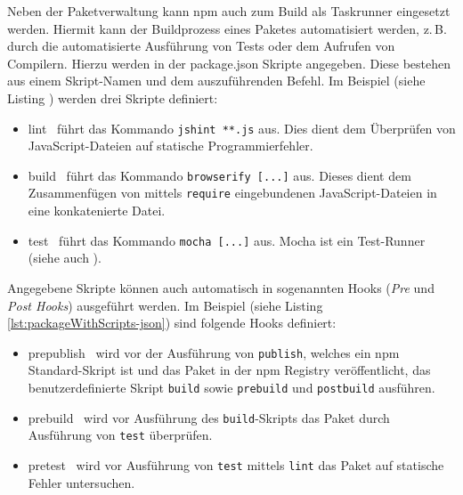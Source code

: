 \begin{figure}[H]
	
\end{figure}

Neben der Paketverwaltung kann npm auch zum Build als Taskrunner eingesetzt werden. Hiermit kann der Buildprozess eines Paketes automatisiert werden, z.\,B. durch die automatisierte Ausführung von Tests oder dem Aufrufen von Compilern. Hierzu werden in der package.json Skripte angegeben. Diese bestehen aus einem Skript-Namen und dem auszuführenden Befehl. Im Beispiel (siehe Listing \todo{}) werden drei Skripte definiert:\cite{cirkel-npmAsABuildTool}
\begin{itemize}
	\item \glqq lint\grqq~ führt das Kommando \texttt{jshint **.js} aus. Dies dient dem Überprüfen von JavaScript-Dateien auf statische Programmierfehler\cite{jshint-about}.
	\item \glqq build\grqq~ führt das Kommando \texttt{browserify [...]} aus. Dieses dient dem Zusammenfügen von mittels \texttt{require} eingebundenen JavaScript-Dateien in eine konkatenierte Datei\cite{browserify-about}.
	\item \glqq test\grqq~ führt das Kommando \texttt{mocha [...]} aus. Mocha ist ein Test-Runner (siehe auch ).
\end{itemize}

Angegebene Skripte können auch automatisch in sogenannten Hooks (\textit{Pre} und \textit{Post Hooks}) ausgeführt werden. Im Beispiel (siehe Listing \ref{lst:packageWithScripts-json}) sind folgende Hooks definiert:\cite{cirkel-npmAsABuildTool}
\begin{itemize}
	\item \glqq prepublish\grqq~ wird vor der Ausführung von \texttt{publish}, welches ein npm Standard-Skript ist und das Paket in der npm Registry veröffentlicht\cite{npm-publish}, das benutzerdefinierte Skript \texttt{build} sowie \texttt{prebuild} und \texttt{postbuild} ausführen.
	\item \glqq prebuild\grqq~ wird vor Ausführung des \texttt{build}-Skripts das Paket durch Ausführung von \texttt{test} überprüfen.
	\item \glqq pretest\grqq~ wird vor Ausführung von \texttt{test} mittels \texttt{lint} das Paket auf statische Fehler untersuchen.
\end{itemize}

\begin{figure}[H]
	
\end{figure}

